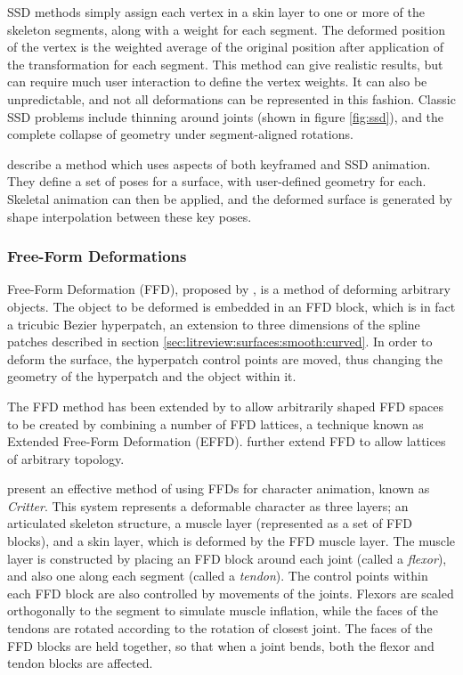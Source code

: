 SSD methods simply assign each vertex in a skin layer to one or more of the skeleton segments, along with a weight for each segment. The deformed position of the vertex is the weighted average of the original position after application of the transformation for each segment. This method can give realistic results, but can require much user interaction to define the vertex weights. It can also be unpredictable, and not all deformations can be represented in this fashion. Classic SSD problems include thinning around joints (shown in figure \ref{fig:ssd}), and the complete collapse of geometry under segment-aligned rotations.

\citet{Lewis00} describe a method which uses aspects of both keyframed and SSD animation. They define a set of poses for a surface, with user-defined geometry for each. Skeletal animation can then be applied, and the deformed surface is generated by shape interpolation between these key poses.

\subsubsection{\label{sec:litreview:animation:geometric:ffd}Free-Form Deformations}
Free-Form Deformation (FFD), proposed by \citet{Sederberg86}, is a method of deforming arbitrary objects. The object to be deformed is embedded in an FFD block, which is in fact a tricubic Bezier hyperpatch, an extension to three dimensions of the spline patches described in section \ref{sec:litreview:surfaces:smooth:curved}. In order to deform the surface, the hyperpatch control points are moved, thus changing the geometry of the hyperpatch and the object within it.

The FFD method has been extended by \citet{Coquillart90} to allow arbitrarily shaped FFD spaces to be created by combining a number of FFD lattices, a technique known as Extended Free-Form Deformation (EFFD). \citet{MacCracken96} further extend FFD to allow lattices of arbitrary topology.

\citet{Chadwick89} present an effective method of using FFDs for character animation, known as {\it Critter}. This system represents a deformable character as three layers; an articulated skeleton structure, a muscle layer (represented as a set of FFD blocks), and a skin layer, which is deformed by the FFD muscle layer. The muscle layer is constructed by placing an FFD block around each joint (called a {\it flexor}), and also one along each segment (called a {\it tendon}). The control points within each FFD block are also controlled by movements of the joints. Flexors are scaled orthogonally to the segment to simulate muscle inflation, while the faces of the tendons are rotated according to the rotation of closest joint. The faces of the FFD blocks are held together, so that when a joint bends, both the flexor and tendon blocks are affected.

